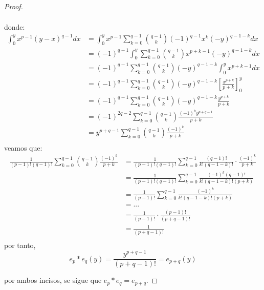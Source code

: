 \documentclass[12pt]{report}
\newcounter{it}
\theoremstyle{largebreak}
\begin{document}
\begin{proof}
\begin{itemize}
\begin{equation*}
\begin{split}
                \end{split}
            \end{equation*}
            donde:
            \begin{equation*}
                \begin{split}
                    \int_{0}^y x^{p-1}(y-x)^{q-1}dx&=\int_0^yx^{p-1}\sum_{k=0}^{q-1}\binom{q-1}{k}(-1)^{q-1}x^k(-y)^{q-1-k}dx\\
                    &=(-1)^{q-1}\int_0^y\sum_{k=0}^{q-1}\binom{q-1}{k}x^{p+k-1}(-y)^{q-1-k}dx\\
                    &=(-1)^{q-1}\sum_{k=0}^{q-1}\binom{q-1}{k}(-y)^{q-1-k}\int_0^yx^{p+k-1}dx\\
                    &=(-1)^{q-1}\sum_{k=0}^{q-1}\binom{q-1}{k}(-y)^{q-1-k}\left[\frac{x^{p+k}}{p+k} \right]_0^y \\
                    &=(-1)^{q-1}\sum_{k=0}^{q-1}\binom{q-1}{k}(-y)^{q-1-k}\frac{y^{p+k}}{p+k} \\
                    &=(-1)^{2q-2}\sum_{k=0}^{q-1}\binom{q-1}{k}\frac{(-1)^ky^{p+q-1}}{p+k} \\
                    &=y^{p+q-1}\sum_{k=0}^{q-1}\binom{q-1}{k}\frac{(-1)^k}{p+k} \\
                \end{split}
            \end{equation*}
            veamos que:
            \begin{equation*}
                \begin{split}
                    \frac{1}{(p-1)!(q-1)!}\sum_{k=0}^{q-1}\binom{q-1}{k}\frac{(-1)^k}{p+k}
                    &=\frac{1}{(p-1)!(q-1)!}\sum_{k=0}^{q-1}\frac{(q-1)!}{k!(q-1-k)!}\cdot\frac{(-1)^k}{p+k}\\
                    &=\frac{1}{(p-1)!(q-1)!}\sum_{k=0}^{q-1}\frac{(-1)^k(q-1)!}{k!(q-1-k)!(p+k)} \\
                    &=\frac{1}{(p-1)!}\sum_{k=0}^{q-1}\frac{(-1)^k}{k!(q-1-k)!(p+k)} \\
                    &=...\\
                    &=\frac{1}{(p-1)!}\cdot\frac{(p-1)!}{(p+q-1)!} \\
                    &=\frac{1}{(p+q-1)!}\\
                \end{split}
            \end{equation*}
            por tanto,
            \begin{equation*}
                e_p*e_q(y)=\frac{y^{p+q-1}}{(p+q-1)!}=e_{p+q}(y)
            \end{equation*}
        \end{itemize}
        por ambos incisos, se sigue que $e_p*e_q=e_{p+q}$.


\end{proof}
\end{document}
